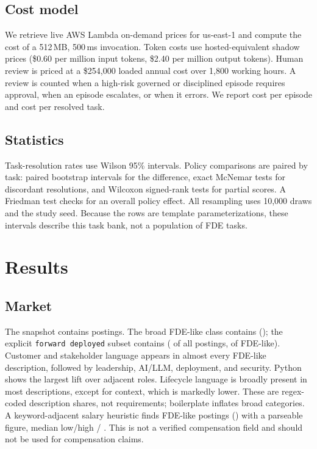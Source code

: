 \documentclass[11pt]{article}
\begin{document}
\subsection{Cost model}
We retrieve live AWS Lambda on-demand prices for us-east-1 and compute the cost of a 512\,MB, 500\,ms invocation. Token costs use hosted-equivalent shadow prices (\$0.60 per million input tokens, \$2.40 per million output tokens). Human review is priced at a \$254,000 loaded annual cost over 1,800 working hours. A review is counted when a high-risk governed or disciplined episode requires approval, when an episode escalates, or when it errors. We report cost per episode and cost per resolved task.

\subsection{Statistics}
Task-resolution rates use Wilson 95\% intervals. Policy comparisons are paired by task: paired bootstrap intervals for the difference, exact McNemar tests for discordant resolutions, and Wilcoxon signed-rank tests for partial scores. A Friedman test checks for an overall policy effect. All resampling uses 10,000 draws and the study seed. Because the rows are template parameterizations, these intervals describe this task bank, not a population of FDE tasks.

\section{Results}

\subsection{Market}
The snapshot contains \MarketPostings{} postings. The broad FDE-like class contains \MarketFDE{} (\MarketFDEShare{}); the explicit \texttt{forward deployed} subset contains \MarketExplicit{} (\MarketExplicitShare{} of all postings, \MarketExplicitOfFDE{} of FDE-like). Customer and stakeholder language appears in almost every FDE-like description, followed by leadership, AI/LLM, deployment, and security. Python shows the largest lift over adjacent roles. Lifecycle language is broadly present in most descriptions, except for context, which is markedly lower. These are regex-coded description shares, not requirements; boilerplate inflates broad categories. A keyword-adjacent salary heuristic finds \SalaryN{} FDE-like postings (\SalaryShare{}) with a parseable figure, median low/high \SalaryMedianLow{} / \SalaryMedianHigh{}. This is not a verified compensation field and should not be used for compensation claims.
\end{document}
